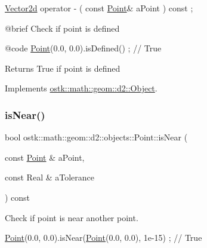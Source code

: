 \begin{DoxyCode}
\hyperlink{namespaceostk_1_1math_1_1obj_a5ce374bc225ecfb685da4fed9aa67e6e}{Vector2d}                operator -                                  (   \textcolor{keyword}{const}   
      \hyperlink{classostk_1_1math_1_1geom_1_1d2_1_1objects_1_1_point_ad4252af4171fbe3cff37ada7827e1966}{Point}&                      aPoint                                      ) \textcolor{keyword}{const} ;

    @brief              Check \textcolor{keywordflow}{if} point is defined
   
    @code
                        \hyperlink{classostk_1_1math_1_1geom_1_1d2_1_1objects_1_1_point_ad4252af4171fbe3cff37ada7827e1966}{Point}(0.0, 0.0).isDefined() ; \textcolor{comment}{// True}
\end{DoxyCode}


\begin{DoxyReturn}{Returns}
True if point is defined 
\end{DoxyReturn}


Implements \hyperlink{classostk_1_1math_1_1geom_1_1d2_1_1_object_a456cc7121218d24c1322d0fe54230cc4}{ostk\+::math\+::geom\+::d2\+::\+Object}.

\mbox{\label{classostk_1_1math_1_1geom_1_1d2_1_1objects_1_1_point_aa9be8a5dd8b6d33398e0aba89308c71f}} 
\subsubsection{\texorpdfstring{is\+Near()}{isNear()}}
{\footnotesize\ttfamily bool ostk\+::math\+::geom\+::d2\+::objects\+::\+Point\+::is\+Near (\begin{DoxyParamCaption}\item[{const \hyperlink{classostk_1_1math_1_1geom_1_1d2_1_1objects_1_1_point}{Point} \&}]{a\+Point,  }\item[{const Real \&}]{a\+Tolerance }\end{DoxyParamCaption}) const}



Check if point is near another point. 


\begin{DoxyCode}
\hyperlink{classostk_1_1math_1_1geom_1_1d2_1_1objects_1_1_point_ad4252af4171fbe3cff37ada7827e1966}{Point}(0.0, 0.0).isNear(\hyperlink{classostk_1_1math_1_1geom_1_1d2_1_1objects_1_1_point_ad4252af4171fbe3cff37ada7827e1966}{Point}(0.0, 0.0), 1e-15) ; \textcolor{comment}{// True}
\end{DoxyCode}



